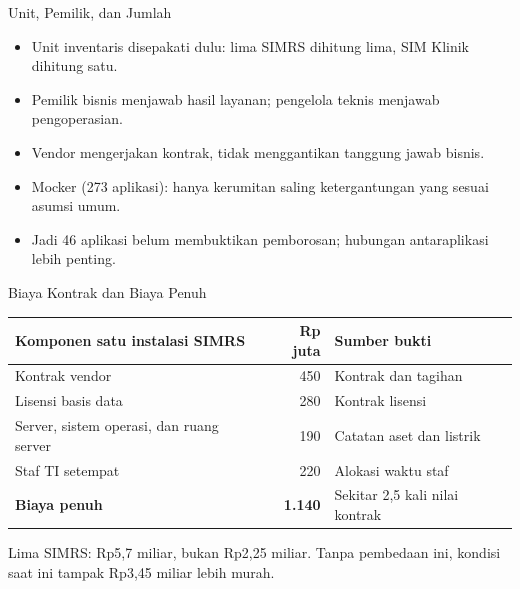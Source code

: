 \documentclass[aspectratio=169, table, 12pt]{beamer}
\begin{document}
\begin{frame}{{\Large Unit, Pemilik, dan Jumlah}}
  \vspace{10pt}
  \begin{itemize}
    \item Unit inventaris disepakati dulu: lima SIMRS dihitung lima, SIM Klinik dihitung satu.
    \item Pemilik bisnis menjawab hasil layanan; pengelola teknis menjawab pengoperasian.
    \item Vendor mengerjakan kontrak, tidak menggantikan tanggung jawab bisnis.
    \item Mocker (273 aplikasi): hanya kerumitan saling ketergantungan yang sesuai asumsi umum.
    \item Jadi 46 aplikasi belum membuktikan pemborosan; hubungan antaraplikasi lebih penting.
  \end{itemize}
\end{frame}

\begin{frame}{{\Large Biaya Kontrak dan Biaya Penuh}}
  \footnotesize
  \begin{tabularx}{\textwidth}{>{\raggedright\arraybackslash}Xr>{\raggedright\arraybackslash}p{5.2cm}}
    \hline
    \textbf{Komponen satu instalasi SIMRS} & \textbf{Rp juta} & \textbf{Sumber bukti} \\
    \hline
    Kontrak vendor & 450 & Kontrak dan tagihan \\
    \hline
    Lisensi basis data & 280 & Kontrak lisensi \\
    \hline
    Server, sistem operasi, dan ruang server & 190 & Catatan aset dan listrik \\
    \hline
    Staf TI setempat & 220 & Alokasi waktu staf \\
    \hline
    \textbf{Biaya penuh} & \textbf{1.140} & Sekitar 2,5 kali nilai kontrak \\
    \hline
  \end{tabularx}

  \vspace{8pt}
  \small Lima SIMRS: Rp5,7 miliar, bukan Rp2,25 miliar. Tanpa pembedaan ini, kondisi saat ini tampak Rp3,45 miliar
  lebih murah.
\end{frame}
\end{document}
